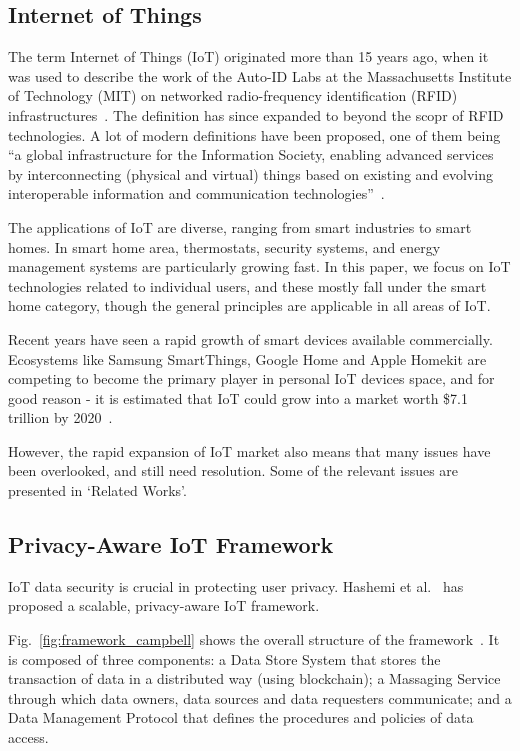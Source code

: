 \subsection{Internet of Things}
The term Internet of Things (IoT) originated more than 15 years ago, when it was used to describe the work of the Auto-ID Labs at the
Massachusetts Institute of Technology (MIT) on networked radio-frequency identification (RFID) infrastructures~\cite{atzori}. The definition has since expanded to beyond the scopr of RFID technologies. A lot of modern definitions have been proposed, one of them being ``a global infrastructure for the Information Society, enabling advanced services by interconnecting (physical and virtual) things based on existing and evolving interoperable information and communication technologies''~\cite{itu}.

The applications of IoT are diverse, ranging from smart industries to smart homes. In smart home area, thermostats, security systems, and energy management systems are particularly growing fast. In this paper, we focus on IoT technologies related to individual users, and these mostly fall under the smart home category, though the general principles are applicable in all areas of IoT.

Recent years have seen a rapid growth of smart devices available commercially. Ecosystems like Samsung SmartThings, Google Home and Apple Homekit are competing to become the primary player in personal IoT devices space, and for good reason -  it is estimated that IoT could grow into a market worth \$7.1 trillion by 2020~\cite{idc}.

However, the rapid expansion of IoT market also means that many issues have been overlooked, and still need resolution. Some of the relevant issues are presented in `Related Works'.

\subsection{Privacy-Aware IoT Framework}
IoT data security is crucial in protecting user privacy. Hashemi et al.~\cite{campbell} has proposed a scalable, privacy-aware IoT framework.

Fig.~\ref{fig:framework_campbell} shows the overall structure of the framework~\cite{campbell}. It is composed of three components: a Data Store System that stores the transaction of data in a distributed way (using blockchain); a Massaging Service through which data owners, data sources and data requesters communicate; and a Data Management Protocol that defines the procedures and policies of data access.

